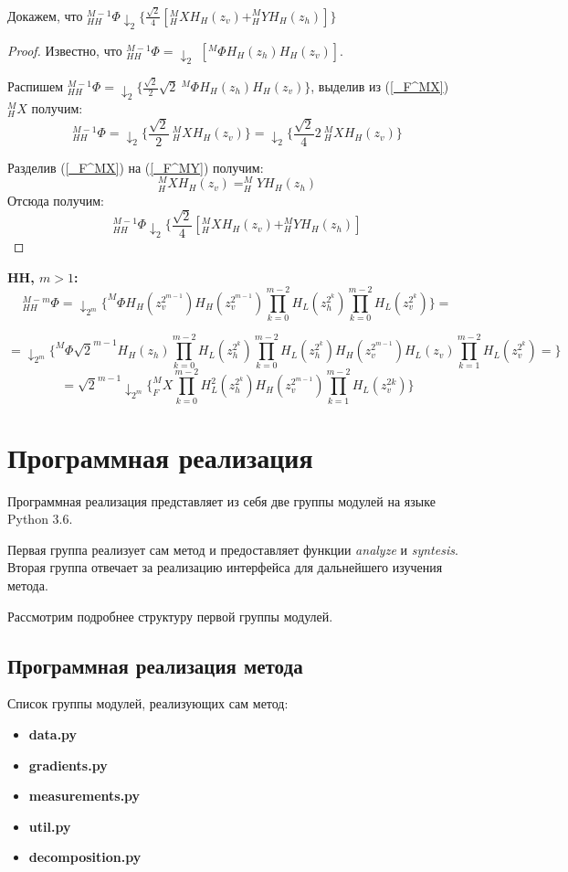 \documentclass[oneside, final, 14pt]{article}
\begin{document}
Докажем, что $_{HH}^{M-1}\Phi\downarrow_2 \{\frac{\sqrt{2}}{4}[_{H}^MX H_H(z_v) + _{H}^MY H_H(z_h)]\}$
\begin{proof}
Известно, что $_{HH}^{M-1}\Phi = \downarrow_2$ $ [^{M}\Phi H_H(z_h)H_H(z_v)]$.

Распишем \begin{math} _{HH}^{M-1}\Phi = \downarrow_2 \{ \frac{\sqrt{2}}{2}\sqrt{2} ~^{M}\Phi H_H(z_h)H_H(z_v) \} \end{math}, выделив из (\ref{_F^MX}) $_H^MX$ получим:
\[
 _{HH}^{M-1}\Phi = \downarrow_2 \{\frac{\sqrt{2}}{2} ~_{H}^MX H_H(z_v)\} = \downarrow_2 \{\frac{\sqrt{2}}{4}2 ~_{H}^MX H_H(z_v)\}
\]

Разделив (\ref{_F^MX}) на (\ref{_F^MY}) получим:
\[
_{H}^MX H_H(z_v) = _{H}^MY H_H(z_h)
\]
Отсюда получим:
\[
_{HH}^{M-1}\Phi\downarrow_2 \{\frac{\sqrt{2}}{4}[_{H}^MX H_H(z_v) + _{H}^MY H_H(z_h)]
\]
\end{proof}

\textbf{HH, $m>1$:}
\[
_{HH}^{M-m}\Phi=\downarrow_{2^m} \{^M\Phi H_H(z_v^{2^{m-1}}) H_H(z_v^{2^{m-1}}) \prod\limits_{k = 0}^{m-2} H_L(z_h^{2^k})
							\prod\limits_{k = 0}^{m-2} H_L(z_v^{2^k})\}=\]
							
\[
=\downarrow_{2^m} \{^M\Phi \sqrt{2}^{m-1} H_H(z_h) \prod \limits_{k=0}^{m-2} H_L(z_h^{2^k})   
\prod \limits_{k=0}^{m-2} H_L(z_h^{2^k}) H_H(z_v^{2^{m-1}})H_L(z_v) \prod \limits _{k=1}^{m-2}H_L(z_v^{2^k})=
  \}
\]
\[
=\sqrt{2}^{m-1} \downarrow_{2^m} \{_F^MX \prod \limits_{k=0}^{m-2} H_L^2(z_h^{2^k}) H_H(z_v^{2^{m-1}}) \prod \limits_{k=1}^{m-2}H_L(z_v^{2k})    \}
\]
\newpage
\section{Программная реализация}
Программная реализация представляет из себя две группы модулей на языке Python 3.6. 

Первая группа реализует сам метод и предоставляет функции \textit{analyze} и \textit{syntesis}. Вторая группа отвечает за реализацию интерфейса для дальнейшего изучения метода.

Рассмотрим подробнее структуру первой группы модулей.

\subsection{Программная реализация метода}
Список группы модулей, реализующих сам метод:
\begin{itemize}
\item \textbf{data.py}
\item \textbf{gradients.py}
\item \textbf{measurements.py}
\item \textbf{util.py}
\item \textbf{decomposition.py}
\end{itemize}
\end{document}
